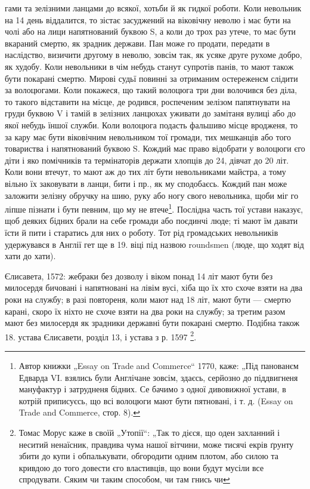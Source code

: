 гами та зелізними ланцами до всякої, хотьби й як гидкої роботи. Коли невольник на 14 день
віддалится, то зістає засуджений на віковічну неволю і має бути на чолі або на
лици напятнований буквою S, а коли до трох раз утече, то має бути вкараний смертю, як зрадник
держави. Пан може го продати, передати в наслідство, визичити другому в неволю, зовсім так, як усяке
друге рухоме добро, як худобу. Коли невольники в чім небудь станут супротів панів, то мают також
бути покарані смертю. Мирові судьї повинні за отриманим остереженєм слідити за волоцюгами. Коли
покажеся, що такий волоцюга три дни волочився без діла, то такого відставити на місце, де родився,
роспеченим зелізом папятнувати на груди буквою V і тамій в зелізних ланцюхах
уживати до замітаня вулиці або до якої небудь їншої служби. Коли волоцюга подасть фальшиво місце
вродженя, то за кару має бути віковічним невольником тої громади,
тих мешканців або того товариства і напятнований буквою S. Кождий має право відобрати у волоцюги єго
діти і яко помічників та термінаторів держати хлопців до 24, дівчат до 20 літ. Коли вони втечут, то
мают аж до тих літ бути невольниками майстра, а тому вільно їх заковувати в ланци, бити і пр., як му
сподобаєсь. Кождий пан може заложити зелізну обручку на шию, руку або ногу свого невольника, щоби
міг го ліпше пізнати і бути певним, що му не втече\footnote{
Автор книжки „Essay on Trade and Commerce“ 1770, каже: „Під панованєм Едварда VI. взялись
були Англічане зовсім, здаєсь, серйозно до піддвигненя мануфактур і затрудненя бідних. Се бачимо з
одної дивовижної устави, в котрій приписуєсь, що всі волоцюги мают бути пятновані, і т. д. (Essay on
Trade and Commerce, стор. 8).
}. Послідна часть тої устави наказує, щоб
деяких бідних брали на себе громади або поєдинчі люде; ті мают їм давати їсти
й пити і старатись для них о роботу. Тот рід громадських невольників удержувався в Англії гет ще в
19. віці під назвою roundsmen (люде, що ходят від хати до хати).

Єлисавета, 1572: жебраки без дозволу і віком понад 14 літ мают бути без милосердя бичовані і
напятновані на лівім вусі, хіба що їх хто схоче взяти на два роки на службу; в разі повтореня, коли
мают над 18 літ, мают бути — смертю карані, скоро їх ніхто не схоче взяти на два роки на службу; за
третим разом мают без милосердя як зрадники державні бути покарані смертю. Подібна також 18. устава
Єлисавети, розділ 13, і устава з р. 1597 \footnote{
Томас Морус каже в своїй „Утопії“: „Так то дієся, що оден захланний і неситий ненаїсник,
правдива чума нашої вітчини, може тисячі екрів ґрунту збити до купи і обпалькувати, обгородити одним
плотом, або силою та кривдою до того довести єго властивців, що вони будут мусіли все спродувати.
Сяким чи таким способом, чи там гнись чи
}.